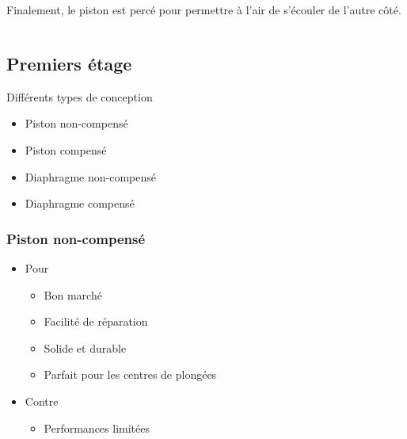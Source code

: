 \documentclass[aspectratio=1610,english,12pt]{beamer}
\begin{document}
\begin{frame}{\insertsubsection}
	\begin{columns}[onlytextwidth]
			Finalement, le piston est percé pour permettre à l'air de s'écouler de l'autre côté.
	\end{columns}
\end{frame}

\begin{frame}{\insertsubsection}
\end{frame}

\subsection{Premiers étage}

\begin{frame}{Différents types de conception }
	\begin{itemize}
		\item Piston non-compensé
		\item Piston compensé
		\item Diaphragme non-compensé
		\item Diaphragme compensé
	\end{itemize}
\end{frame}

\subsubsection{Piston non-compensé}
\begin{frame}{\insertsubsubsection}
\end{frame}

\begin{frame}{\insertsubsubsection}
\end{frame}

\begin{frame}{\insertsubsubsection}
	\begin{itemize}
		\item Pour
		\begin{itemize}
			\item Bon marché
			\item Facilité de réparation
			\item Solide et durable
			\item Parfait pour les centres de plongées
		\end{itemize}
		\item Contre
		\begin{itemize}
			\item Performances limitées
		\end{itemize}
	\end{itemize}
\end{frame}
\end{document}
